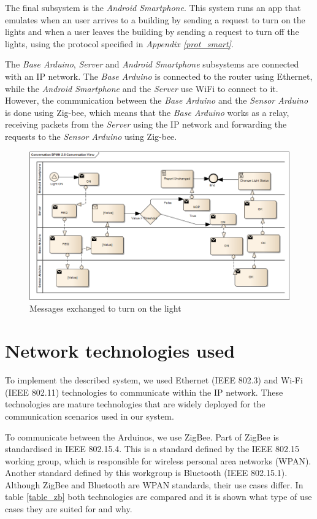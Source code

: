 \documentclass[conference, a4paper]{IEEEtran}
\begin{document}
The final subsystem is the \textit{Android Smartphone}. This system runs an app that emulates when an user arrives to a building by sending a request to turn on the lights and when a user leaves the building by sending a request to turn off the lights, using the protocol specified in \textit{Appendix \ref{prot_smart}}.

The \textit{Base Arduino}, \textit{Server} and \textit{Android Smartphone} subsystems are connected with an IP network. The \textit{Base Arduino} is connected to the router using Ethernet, while the \textit{Android Smartphone} and the \textit{Server} use WiFi to connect to it. However, the communication between the \textit{Base Arduino} and the \textit{Sensor Arduino} is done using Zig-bee, which means that the \textit{Base Arduino} works as a relay, receiving packets from the \textit{Server} using the IP network and forwarding the requests to the \textit{Sensor Arduino} using Zig-bee.

\begin{figure}
\centering
\includegraphics[width=6in]{ON_Flow}
\caption{Messages exchanged to turn on the light}
\label{fig_on_f}
\end{figure}

\section{Network technologies used}
\label{net_tech}

To implement the described system, we used Ethernet (IEEE 802.3) and Wi-Fi (IEEE 802.11) technologies to communicate within the IP network. These technologies are mature technologies that are widely deployed for the communication scenarios used in our system.

To communicate between the Arduinos, we use ZigBee. Part of ZigBee is standardised in IEEE 802.15.4. This is a standard defined by the IEEE 802.15 working group, which is responsible for wireless personal area networks (WPAN). Another standard defined by this workgroup is Bluetooth (IEEE 802.15.1). Although ZigBee and Bluetooth are WPAN standards, their use cases differ. In table \ref{table_zb} both technologies are compared and it is shown what type of use cases they are suited for and why.
\end{document}
